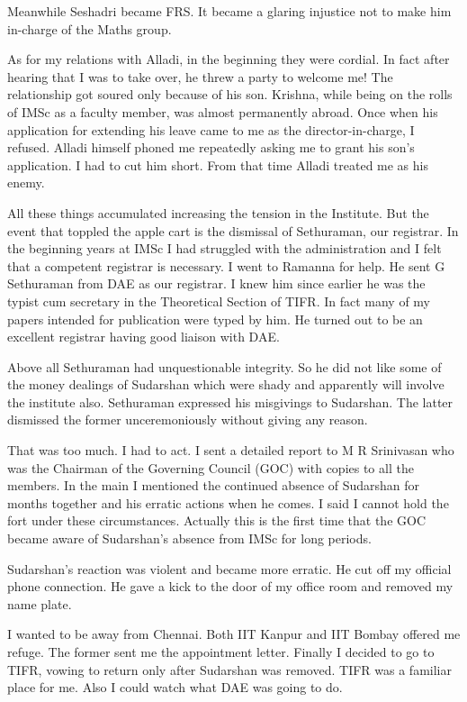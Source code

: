 Meanwhile Seshadri became FRS. It became a glaring injustice not to make 
him in-charge of the Maths group.

As for my relations with Alladi, in the beginning they were cordial. 
In fact after hearing that I was to take over, he threw a party to 
welcome me! The relationship got soured only because of his son. 
Krishna, while being on the rolls of IMSc as a fa\-culty member, was 
almost permanently abroad. Once when his appli\-cation for extending his 
leave came to me as the director-in-charge, I refused. Alladi himself 
phoned me repeatedly asking me to grant his son's application. I had to 
cut him short. From that time Alladi treated me as his enemy.
 
All these things accumulated increasing the tension in the Institute. 
But the event that toppled the apple cart is the dismissal of 
Sethuraman, our registrar. In the beginning years at IMSc I had 
struggled with the administration and I felt that a competent registrar 
is necessary. I went to Ramanna for help. He sent G Sethuraman from DAE 
as our registrar. I knew him since earlier he was the typist cum 
secretary in the Theoretical Section of TIFR. In fact many of my papers 
intended for publication were typed by him. He turned out to be an 
excellent regi\-strar having good liaison with DAE.

Above all Sethuraman had unquestionable integrity. So he did not like 
some of the money dealings of Sudarshan which were shady and apparently 
will involve the institute also. Sethuraman expressed his misgivings to 
Sudarshan. The latter dismissed the former unceremoniously without giving 
any reason.

That was too much. I had to act. I sent a detailed report to M R 
Srinivasan who was the Chairman of the Governing Council (GOC) with 
copies to all the members. In the main I mentioned the continued absence 
of Sudarshan for months together and his erratic actions when he comes. 
I said I cannot hold the fort under these circumstances. Actually this 
is the first time that the GOC became aware of Sudarshan's absence from 
IMSc for long periods.

Sudarshan's reaction was violent and became more erratic. He cut off my 
official phone connection. He gave a kick to the door of my office room 
and removed my name plate.

I wanted to be away from Chennai. Both IIT Kanpur and IIT Bombay offered me refuge.
The former sent me the appointment letter. Finally I decided to
go to TIFR, vowing to return only after Sudarshan was removed. TIFR was a familiar place for me. Also 
I could watch what DAE was going to do.


